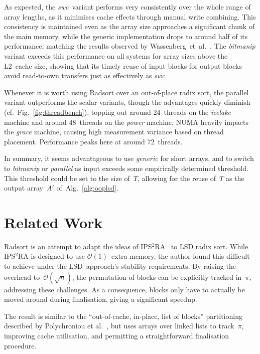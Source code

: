 \documentclass[nolineno,a4paper,UKenglish,cleveref, autoref, thm-restate]{socg-lipics-v2021}
\begin{document}
As expected, the \emph{swc}~variant performs very
consistently over the whole range of array lengths, as it minimises cache effects
through manual write combining.  This consistency is maintained even as the array
size approaches a significant chunk of the main memory, while the generic
implementation drops to around half of its performance, matching the results
observed by Wassenberg~et~al.~\cite{Wassenberg2010}.
The \emph{bitmanip} variant exceeds this performance on all
systems for array sizes above the L2~cache size, showing that its timely reuse
of input blocks for output blocks avoid read-to-own transfers just as effectively
as \emph{swc}.

Whenever it is worth using Radsort over an out-of-place radix sort, the parallel
variant outperforms the scalar variants, though the advantages quickly diminish
(cf.~Fig.~\ref{fig:threadbench}), topping out around 24~threads on the
\emph{icelake} machine and around 48~threads on the \emph{power} machine.
NUMA heavily impacts the \emph{grace} machine, causing high measurement
variance based on thread placement. Performance peaks here at around 72~threads.

In summary, it seems advantageous to use \emph{generic} for short
arrays, and to switch to \emph{bitmanip} or \emph{parallel} as input exceeds some
empirically determined threshold.
This threshold could be set to the size of~$T$, allowing for the reuse of~$T$ as
the output array~$A'$ of~Alg.~\ref{alg:ooplsd}.

\section{Related Work}
Radsort is an attempt to adapt the ideas of IPS${}^2$RA~\cite{Axtmann2022}
to LSD radix sort.  While IPS${}^2$RA is designed to use
$\mathcal O(1)$~extra memory, the author found this difficult
to achieve under the LSD~approach's stability requirements.
By raising the overhead to~$\mathcal O(\sqrt n)$, the permutation of blocks can
be explicitly tracked in~$\pi$, addressing these challenges.
As a consequence, blocks only have to actually be moved around during finalisation,
giving a significant speedup.

The result is similar to the ``out-of-cache, in-place, list of blocks'' partitioning
described by Polychroniou et al.~\cite[\S~3.2.3]{Polychroniou2014}, but uses arrays
over linked lists to track~$\pi$, improving cache utilisation, and permitting a
straightforward finalisation procedure.
\end{document}

